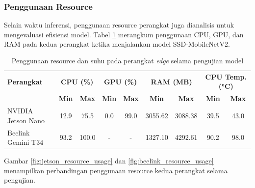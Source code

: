 
\subsubsection{Penggunaan Resource}

Selain waktu inferensi, penggunaan resource perangkat juga dianalisis untuk mengevaluasi efisiensi model. Tabel \ref{tab:resource_usage} merangkum penggunaan CPU, GPU, dan RAM pada kedua perangkat ketika menjalankan model SSD-MobileNetV2.

\begin{table}[htbp]
  \centering
  \begin{tabular}{|l|c|c|c|c|c|c|c|c|}
  \hline
  \rowcolor[HTML]{C0C0C0}
  \textbf{Perangkat} & \multicolumn{2}{c|}{\textbf{CPU (\%)}} & \multicolumn{2}{c|}{\textbf{GPU (\%)}} & \multicolumn{2}{c|}{\textbf{RAM (MB)}} & \multicolumn{2}{c|}{\textbf{CPU Temp. (°C)}} \\
  \cline{2-9}
  \rowcolor[HTML]{C0C0C0}
  & \textbf{Min} & \textbf{Max} & \textbf{Min} & \textbf{Max} & \textbf{Min} & \textbf{Max} & \textbf{Min} & \textbf{Max} \\
  \hline
  NVIDIA Jetson Nano & 12.9 & 75.5 & 0.0 & 99.0 & 3055.62 & 3088.38 & 39.5 & 43.0 \\
  \hline
  Beelink Gemini T34 & 93.2 & 100.0 & - & - & 1327.10 & 4292.61 & 90.2 & 98.0 \\
  \hline
  \end{tabular}
  \caption{Penggunaan resource dan suhu pada perangkat \emph{edge} selama pengujian model}
  \label{tab:resource_usage}
\end{table}

Gambar \ref{fig:jetson_resource_usage} dan \ref{fig:beelink_resource_usage} menampilkan perbandingan penggunaan resource kedua perangkat selama pengujian.

